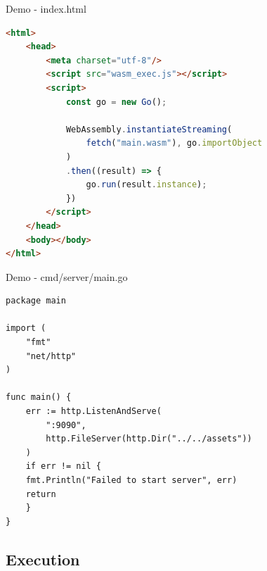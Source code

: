 \documentclass{beamer}
\begin{document}
\begin{frame}[fragile]{Demo - index.html}
    \begin{lstlisting}[language=html,basicstyle=\scriptsize]
<html>
    <head>
        <meta charset="utf-8"/>
        <script src="wasm_exec.js"></script>
        <script>
            const go = new Go();

            WebAssembly.instantiateStreaming(
                fetch("main.wasm"), go.importObject
            )
            .then((result) => {
                go.run(result.instance);
            })
        </script>
    </head>
    <body></body>
</html>
\end{lstlisting}
\end{frame}

\begin{frame}[fragile]{Demo - cmd/server/main.go}
    \begin{lstlisting}[language=html,basicstyle=\scriptsize]
package main

import (
	"fmt"
	"net/http"
)

func main() {
    err := http.ListenAndServe(
        ":9090", 
        http.FileServer(http.Dir("../../assets"))
    )
    if err != nil {
	fmt.Println("Failed to start server", err)
	return
    }
}

    \end{lstlisting}
\end{frame}

\subsection{Execution}
\end{document}
